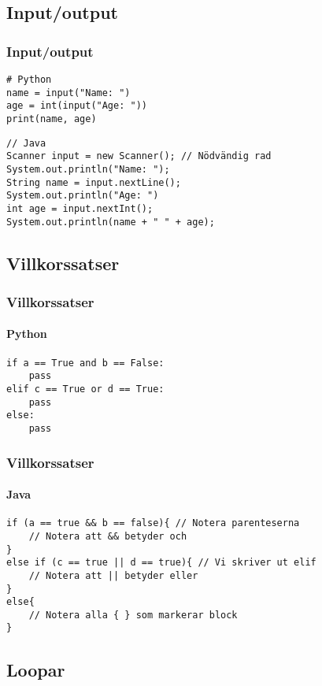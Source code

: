 \documentclass[aspectratio=169]{beamer}
\begin{document}
\subsection{Input/output}

\begin{frame}[fragile]
    \frametitle{Input/output}

    \begin{lstlisting}[style=python]
# Python
name = input("Name: ")
age = int(input("Age: "))
print(name, age)
    \end{lstlisting}

    \begin{lstlisting}[style=java]
// Java
Scanner input = new Scanner(); // Nödvändig rad
System.out.println("Name: ");
String name = input.nextLine();
System.out.println("Age: ")
int age = input.nextInt();
System.out.println(name + " " + age);
    \end{lstlisting}

\end{frame}

\subsection{Villkorssatser}

\begin{frame}[fragile]
    \frametitle{Villkorssatser}
    \framesubtitle{Python}

    \begin{lstlisting}[style=python]
if a == True and b == False:
    pass
elif c == True or d == True:
    pass
else:
    pass
    \end{lstlisting}

\end{frame}

\begin{frame}[fragile]
    \frametitle{Villkorssatser}
    \framesubtitle{Java}

    \begin{lstlisting}[style=java]
if (a == true && b == false){ // Notera parenteserna
    // Notera att && betyder och
}
else if (c == true || d == true){ // Vi skriver ut elif
    // Notera att || betyder eller
}
else{
    // Notera alla { } som markerar block
}
    \end{lstlisting}

\end{frame}

\subsection{Loopar}
\end{document}
